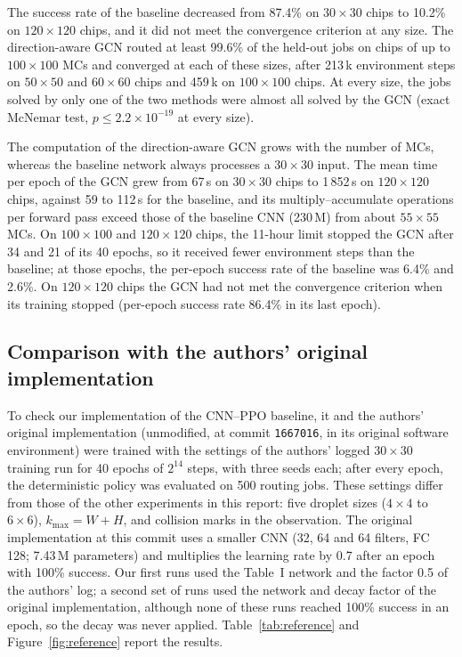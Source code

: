 \documentclass[11pt,a4paper]{article}
\begin{document}
The success rate of the baseline decreased from 87.4\% on $30\times30$ chips
to 10.2\% on $120\times120$ chips, and it did not meet the convergence
criterion at any size. The direction-aware GCN routed at least 99.6\% of the
held-out jobs on chips of up to $100\times100$ MCs and converged at each of
these sizes, after 213\,k environment steps on $50\times50$ and $60\times60$
chips and 459\,k on $100\times100$ chips. At every size, the jobs solved by
only one of the two methods were almost all solved by the GCN (exact McNemar
test, $p\leq2.2\times10^{-19}$ at every size).

The computation of the direction-aware GCN grows with the number of MCs,
whereas the baseline network always processes a $30\times30$ input. The mean
time per epoch of the GCN grew from 67\,s on $30\times30$ chips to 1\,852\,s on
$120\times120$ chips, against 59 to 112\,s for the baseline, and its
multiply--accumulate operations per forward pass exceed those of the baseline
CNN (230\,M) from about $55\times55$ MCs. On $100\times100$ and $120\times120$
chips, the 11-hour limit stopped the GCN after 34 and 21 of its 40 epochs, so
it received fewer environment steps than the baseline; at those epochs, the
per-epoch success rate of the baseline was 6.4\% and 2.6\%. On $120\times120$
chips the GCN had not met the convergence criterion when its training stopped
(per-epoch success rate 86.4\% in its last epoch).

\subsection{Comparison with the authors' original implementation}\label{sec:refcheck}
To check our implementation of the CNN--PPO baseline, it and the authors'
original implementation \cite{elfarcode} (unmodified, at commit
\texttt{1667016}, in its original software environment) were trained with the
settings of the authors' logged $30\times30$ training run for 40 epochs of
$2^{14}$ steps, with three seeds each; after every epoch, the deterministic
policy was evaluated on 500 routing jobs. These settings differ from those of
the other experiments in this report: five droplet sizes ($4\times4$ to
$6\times6$), $k_{\max}=W+H$, and collision marks in the observation. The
original implementation at this commit uses a smaller CNN (32, 64 and 64
filters, FC 128; 7.43\,M parameters) and multiplies the learning rate by 0.7
after an epoch with 100\% success. Our first runs used the Table~I network and
the factor 0.5 of the authors' log; a second set of runs used the network and
decay factor of the original implementation, although none of these runs
reached 100\% success in an epoch, so the decay was never applied.
Table~\ref{tab:reference} and
Figure~\ref{fig:reference} report the results.
\end{document}
